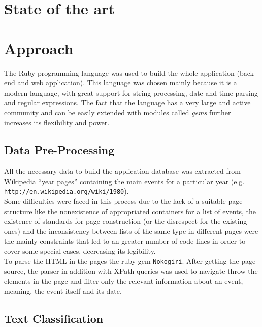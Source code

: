 \documentclass{llncs}
\begin{document}
\section{State of the art}

\section{Approach}
\label{sec:approach}

The Ruby programming language was used to build the whole application (back-end and web application). This language was chosen mainly because it is a modern language, with great support for string processing, date and time parsing and regular expressions. The fact that the language has a very large and active community and can be easily extended with modules called \textit{gems} further increases its flexibility and power.

\subsection{Data Pre-Processing}

All the necessary data to build the application database was extracted from Wikipedia ``year pages'' containing the main events for a particular year (e.g. \verb!http://en.wikipedia.org/wiki/1980!).\\

Some difficulties were faced in this process due to the lack of a suitable page structure like the nonexistence of appropriated containers for a list of events, the existence of standards for page construction (or the disrespect for the existing ones) and the inconsistency between lists of the same type in different pages were the mainly constraints that led to an greater number of code lines in order to cover some special cases, decreasing its legibility.\\

To parse the HTML in the pages the ruby gem \verb!Nokogiri!. After getting the page source, the parser in addition with XPath queries was used to navigate throw the elements in the page and filter only the relevant information about an event, meaning, the event itself and its date.


\subsection{Text Classification}
\label{subsec:approach:text-classification}
\end{document}
